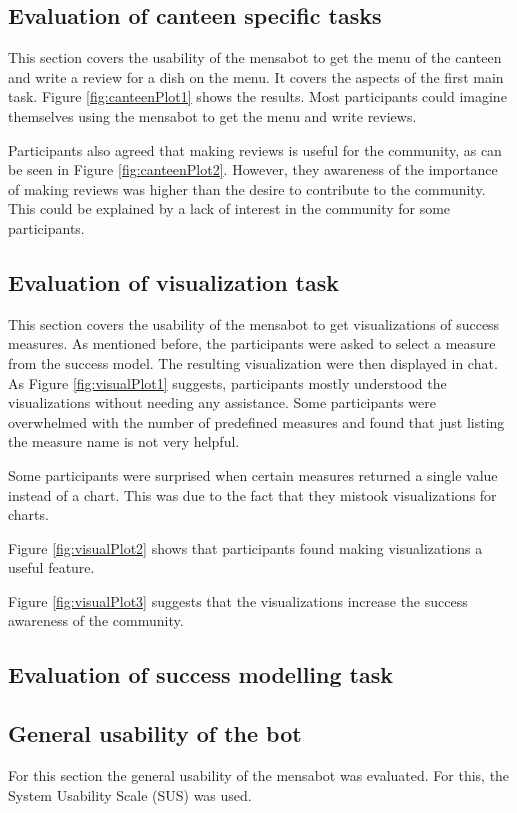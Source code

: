\subsection{Evaluation of canteen specific tasks}  
This section covers the usability of the mensabot to get the menu of the canteen and write a review for a dish on the menu. It covers the aspects of the first main task. Figure \ref{fig:canteenPlot1} shows the results. Most participants could imagine themselves using the mensabot to get the menu and write reviews.
 
Participants also agreed that making reviews is useful for the community, as can be seen in Figure \ref{fig:canteenPlot2}. 
However, they awareness of the importance of making reviews was higher than the desire to contribute to the community. This could be explained by a lack of interest in the community for some participants. 

\subsection{Evaluation of visualization task}

This section covers the usability of the mensabot to get visualizations of success measures. As mentioned before, the participants were asked to select a measure from the success model. The resulting visualization were then displayed in chat. As Figure \ref{fig:visualPlot1} suggests, participants mostly understood the visualizations without needing any assistance. Some participants were overwhelmed with the number of predefined measures and found that just listing the measure name is not very helpful. 

Some participants were surprised when certain measures returned a single value instead of a chart. This was due to the fact that they mistook visualizations for charts. 


Figure \ref{fig:visualPlot2} shows that participants found making visualizations a useful feature. 



Figure \ref{fig:visualPlot3} suggests that the visualizations increase the success awareness of the community. 
\subsection{Evaluation of success modelling task}

\subsection{General usability of the bot}
For this section the general usability of the mensabot was evaluated. For this, the System Usability Scale (SUS) was used.